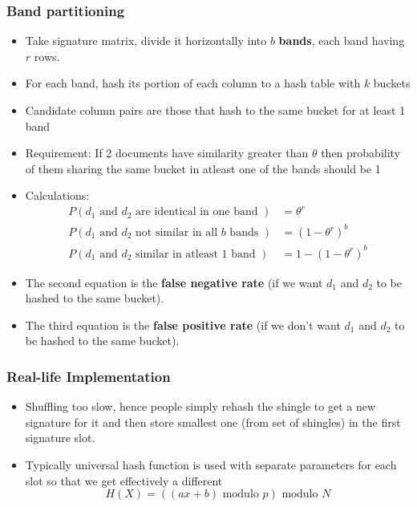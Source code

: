 \documentclass{article}
\begin{document}
\subsubsection{Band partitioning}
\begin{itemize}
    \item Take signature matrix, divide it horizontally into $b$ \textbf{bands}, each band having $r$ rows. 
    
    \item For each band, hash its portion of each column to a hash table with $k$ buckets
    
    \item Candidate column pairs are those that hash to the same bucket for at least 1 band 
    
    \item Requirement: If 2 documents have similarity greater than $\theta$ then probability of them sharing the same bucket in atleast one of the bands should be 1
    
    \item Calculations:
    \begin{align*}
        P(d_1 \text{ and }d_2\text{ are identical in one band }) &= \theta^r \\
        P(d_1 \text{ and }d_2\text{ not similar in all $b$ bands }) &= (1-\theta^r)^b \\
        P(d_1 \text{ and }d_2\text{ similar in atleast 1 band }) &= 1-(1-\theta^r)^b
    \end{align*}
    
    \item The second equation is the \textbf{false negative rate} (if we want $d_1$ and $d_2$ to be hashed to the same bucket).
    
    \item The third equation is the \textbf{false positive rate} (if we don't want $d_1$ and $d_2$ to be hashed to the same bucket). 
\end{itemize}

\subsubsection{Real-life Implementation}
\begin{itemize}
    \item Shuffling too slow, hence people simply rehash the shingle to get a new signature for it and then store smallest one (from set of shingles) in the first signature slot.
    
    \item Typically universal hash function is used with separate parameters for each slot so that we get effectively a different 
    \begin{equation*}
        H(X) = ((ax + b)\text{ modulo }p)\text{ modulo } N
    \end{equation*}
\end{itemize}
\end{document}
